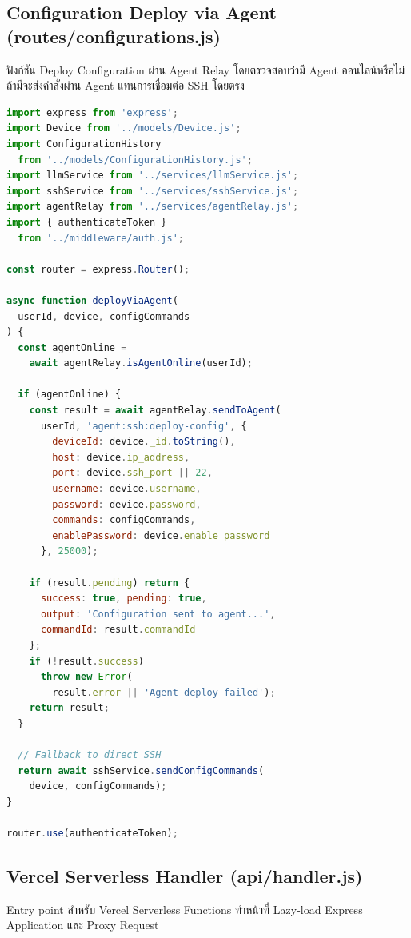\subsection{Configuration Deploy via Agent (routes/configurations.js)}
\hspace*{1.3em}
ฟังก์ชัน Deploy Configuration ผ่าน Agent Relay โดยตรวจสอบว่ามี Agent ออนไลน์หรือไม่ ถ้ามีจะส่งคำสั่งผ่าน Agent แทนการเชื่อมต่อ SSH โดยตรง

\begin{lstlisting}[language=JavaScript, caption={routes/configurations.js -- Deploy via Agent}]
import express from 'express';
import Device from '../models/Device.js';
import ConfigurationHistory
  from '../models/ConfigurationHistory.js';
import llmService from '../services/llmService.js';
import sshService from '../services/sshService.js';
import agentRelay from '../services/agentRelay.js';
import { authenticateToken }
  from '../middleware/auth.js';

const router = express.Router();

async function deployViaAgent(
  userId, device, configCommands
) {
  const agentOnline =
    await agentRelay.isAgentOnline(userId);

  if (agentOnline) {
    const result = await agentRelay.sendToAgent(
      userId, 'agent:ssh:deploy-config', {
        deviceId: device._id.toString(),
        host: device.ip_address,
        port: device.ssh_port || 22,
        username: device.username,
        password: device.password,
        commands: configCommands,
        enablePassword: device.enable_password
      }, 25000);

    if (result.pending) return {
      success: true, pending: true,
      output: 'Configuration sent to agent...',
      commandId: result.commandId
    };
    if (!result.success)
      throw new Error(
        result.error || 'Agent deploy failed');
    return result;
  }

  // Fallback to direct SSH
  return await sshService.sendConfigCommands(
    device, configCommands);
}

router.use(authenticateToken);
\end{lstlisting}

\subsection{Vercel Serverless Handler (api/handler.js)}
\hspace*{1.3em}
Entry point สำหรับ Vercel Serverless Functions ทำหน้าที่ Lazy-load Express Application และ Proxy Request

